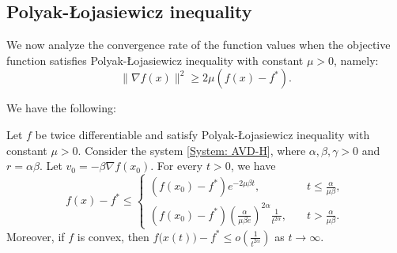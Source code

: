 \documentclass[onefignum,onetabnum]{siamart220329}
\begin{document}
\subsection{Polyak-\L ojasiewicz inequality}
We now analyze the convergence rate of the function values when the objective function satisfies Polyak-\L ojasiewicz inequality with constant $\mu >0$, namely:
\begin{equation} \label{E: PL}
\| \nabla f(x) \|^2 \ge 2\mu( f(x) - f^* ).    
\end{equation}

We have the following:

\begin{theorem}\label{Thm: dynamics_PL}
Let $f$ be twice differentiable and satisfy Polyak-\L ojasiewicz inequality with constant $\mu > 0$. Consider the system \eqref{System: AVD-H}, where $\alpha,\beta,\gamma>0$ and $r= \alpha\beta$. Let $v_0 = -\beta\nabla f(x_0)$. For every $t>0$, we have  
\begin{equation*}
f(x) - f^* \le\left\{
\begin{array}{ll}
\left( f(x_0) - f^* \right) e^{-2\mu\beta t},&\quad t\le \frac{\alpha}{\mu\beta}, \\[5pt]
\left( f(x_0) - f^* \right) \left( \frac{\alpha}{\mu\beta e} \right)^{2\alpha}\frac{1}{t^{2\alpha}},&\quad t > \frac{\alpha}{\mu\beta}.
\end{array}
\right.
\end{equation*}
Moreover, if $f$ is convex, then $f\big( x(t) \big) - f^* \le o\left( \frac{1}{t^{2\alpha}} \right)$ as $t\to\infty$.
\end{theorem} 
\end{document}
